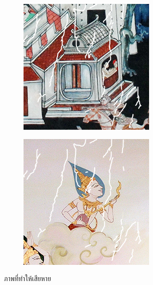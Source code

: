 \documentclass[xcolor=dvipsnames, xetex,serif]{beamer}
\numberwithin{equation}{section}
\begin{document}
\begin{frame}
\begin{figure}[H]
\begin{subfigure}{0.15\linewidth}
            \end{subfigure}
            \begin{subfigure}{0.15\linewidth}
                \centering
                \includegraphics[width=0.9\linewidth]{images/thaiart/case04-toinpaint.png}			
            \end{subfigure}
            \begin{subfigure}{0.15\linewidth}
                \centering
                \includegraphics[width=0.9\linewidth]{images/thaiart/case05-toinpaint.png}			
            \end{subfigure}
            \caption{ภาพที่ทำให้เสียหาย}
        \end{figure}
    \end{frame}
\end{document}
